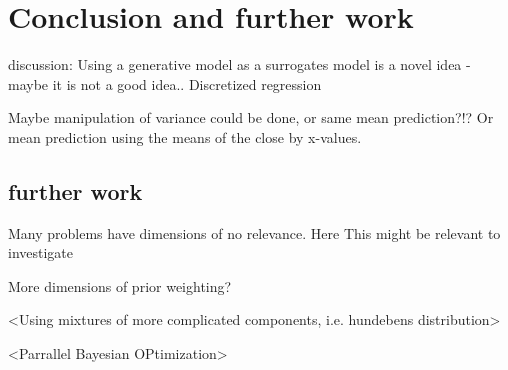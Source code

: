 \chapter{Conclusion and further work}

discussion: Using a generative model as a surrogates model is a novel idea - maybe it is not a good
idea.. Discretized regression

Maybe manipulation of variance could be done, or same mean prediction?!? Or 
mean prediction using the means of the close by x-values. 

\section{further work}
Many problems have dimensions of no relevance. Here This might be relevant to investigate

More dimensions of prior weighting?

<Using mixtures of more complicated components, i.e. hundebens distribution>
 
<Parrallel Bayesian OPtimization>

